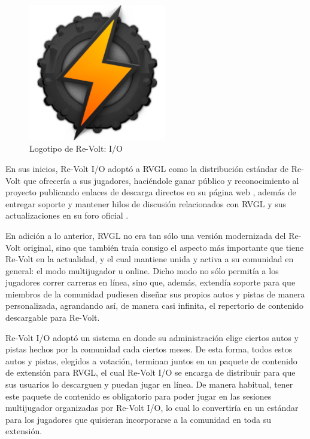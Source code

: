 \begin{figure}[H]
  \begin{center}
    \includegraphics[width=6cm, height=6cm]{img/io.png}
  \end{center}
  \caption[Logotipo de Re-Volt: I/O]{Logotipo de Re-Volt: I/O}
  \label{fig:io}
\end{figure}

En sus inicios, Re-Volt I/O adoptó a RVGL como la distribución estándar de Re-Volt que ofrecería a sus jugadores, haciéndole ganar público y reconocimiento al proyecto publicando enlaces de descarga directos en su página web \cite{revoltio}, además de entregar soporte y mantener hilos de discusión relacionados con RVGL y sus actualizaciones en su foro oficial \cite{forumrevoltio}.

En adición a lo anterior, RVGL no era tan sólo una versión modernizada del Re-Volt original, sino que también traía consigo el aspecto más importante que tiene Re-Volt en la actualidad, y el cual mantiene unida y activa a su comunidad en general: el modo multijugador u online. Dicho modo no sólo permitía a los jugadores correr carreras en línea, sino que, además, extendía soporte para que miembros de la comunidad pudiesen diseñar sus propios autos y pistas de manera personalizada, agrandando así, de manera casi infinita, el repertorio de contenido descargable para Re-Volt.

Re-Volt I/O adoptó un sistema en donde su administración elige ciertos autos y pistas hechos por la comunidad cada ciertos meses. De esta forma, todos estos autos y pistas, elegidos a votación, terminan juntos en un paquete de contenido de extensión para RVGL, el cual Re-Volt I/O se encarga de distribuir para que sus usuarios lo descarguen y puedan jugar en línea. De manera habitual, tener este paquete de contenido es obligatorio para poder jugar en las sesiones multijugador organizadas por Re-Volt I/O, lo cual lo convertiría en un estándar para los jugadores que quisieran incorporarse a la comunidad en toda su extensión.


